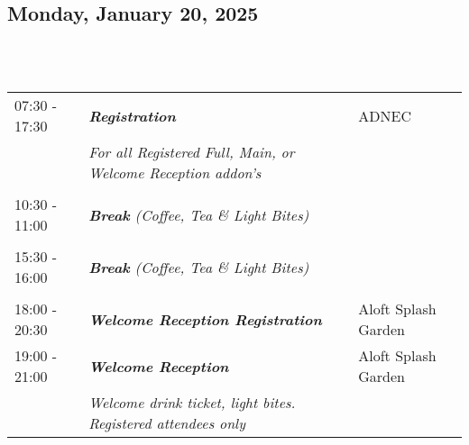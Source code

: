 \subsection{Monday, January 20, 2025}
\\
\\
\begin{longtable}{p{15mm}p{60mm}p{30mm}}
{07:30 - 17:30} & \emph{\textbf{Registration}} & ADNEC \\
& \emph{For all Registered Full, Main, or Welcome Reception addon’s} & \\\\
{10:30 - 11:00} & \emph{\textbf{Break} (Coffee, Tea \& Light Bites)} & \\\\
{15:30 - 16:00} & \emph{\textbf{Break} (Coffee, Tea \& Light Bites)} & \\\\
{18:00 - 20:30} & \emph{\textbf{Welcome Reception Registration}} & Aloft Splash Garden \\
{19:00 - 21:00} & \emph{\textbf{Welcome Reception}} & Aloft Splash Garden \\
& \emph{Welcome drink ticket, light bites. Registered attendees only} &
\end{longtable}

